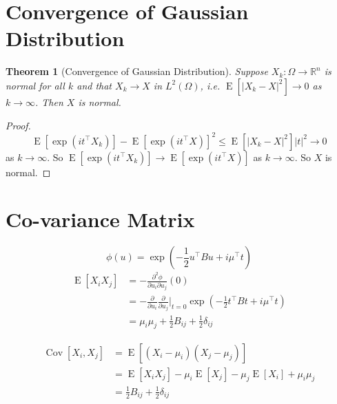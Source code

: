 \documentclass[12pt]{article}
\newtheorem{theorem}{Theorem}
\begin{document}
\section{Convergence of Gaussian Distribution}
\begin{theorem}[Convergence of Gaussian Distribution]
    Suppose $X_k:\Omega\rightarrow\mathbb{R}^n$ is normal for all $k$ and that $X_k\rightarrow X$ in $L^2(\Omega)$, i.e. $\operatorname{E}[|X_k-X|^2]\rightarrow 0$ as $k\rightarrow\infty$. Then $X$ is normal.
\end{theorem}
\begin{proof}
    $$\operatorname{E}[\exp(i t^{\top}X_k)]-\operatorname{E}[\exp(i t^{\top}X)]^2\le \operatorname{E}[|X_k-X|^2] |t|^2\rightarrow 0$$ as $k\rightarrow\infty$. So $\operatorname{E}[\exp(i t^{\top}X_k)]\rightarrow \operatorname{E}[\exp(i t^{\top}X)]$ as $k\rightarrow\infty$. So $X$ is normal.
\end{proof}

\section{Co-variance Matrix}
$$ \phi(u)=\exp\left(-\frac{1}{2}u^{\top}Bu+i\mu^{\top}t\right) $$
\begin{align}
    \operatorname{E}[X_i X_j]&=- \frac{\partial^2 \phi}{\partial u_i \partial u_j}(0) \\
    &=- \frac{\partial}{\partial u_i} \frac{\partial}{\partial u_j} \bigg|_{t=0} \exp \left(-\frac{1}{2} t^{\top} B t+i \mu^{\top} t\right) \\
    &=\mu_i \mu_j + \frac{1}{2} B_{ij} + \frac{1}{2} \delta_{ij} 
\end{align}

\begin{align}
    \operatorname{Cov}[X_i,X_j]&=\operatorname{E}[(X_i-\mu_i)(X_j-\mu_j)] \\
    &=\operatorname{E}[X_i X_j]-\mu_i \operatorname{E}[X_j]-\mu_j \operatorname{E}[X_i]+\mu_i \mu_j \\
    &=\frac{1}{2} B_{ij} + \frac{1}{2} \delta_{ij}
\end{align}
\end{document}
